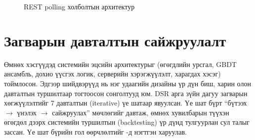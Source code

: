 \begin{figure}[H]
\caption{REST polling холболтын архитектур}
\label{fig:arch_polling}
\end{figure}

\section{Загварын давталтын сайжруулалт}

Өмнөх хэсгүүдэд системийн эцсийн архитектурыг (өгөгдлийн урсгал, GBDT ансамбль, дохио үүсгэх логик, серверийн хэрэгжүүлэлт, харагдах хэсэг) тоймлосон. Эдгээр шийдвэрүүд нь нэг удаагийн дизайны үр дүн биш, харин олон давталтын туршилтаар тогтоосон сонголтууд юм. DSR арга зүйн дагуу загварын хөгжүүлэлтийг 7 давталтын (iterative) үе шатаар явуулсан. Үе шат бүрт ``бүтээх $\to$ үнэлэх $\to$ сайжруулах'' мөчлөгийг давтаж, өмнөх хувилбарын түүхэн өгөгдөл дээрх системийн туршилтын (backtesting) үр дүнд тулгуурлан сул талыг зассан. Үе шат бүрийн гол өөрчлөлтийг -д нэгтгэн харуулав.

